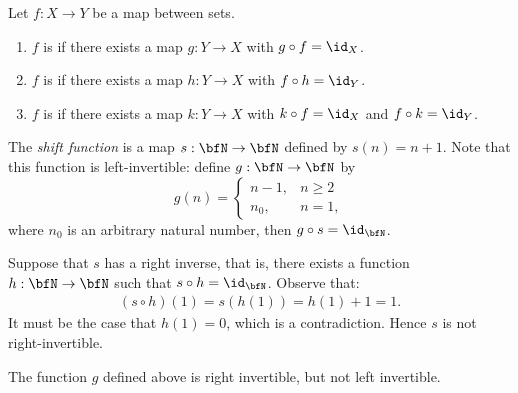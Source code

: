     \begin{definition}
        Let $f:X \rightarrow Y$ be a map between sets.
            \begin{enumerate}[label = (\arabic*)]
                \item $f$ is  if there exists a map $g:Y \rightarrow X$ with $g \circ f = \id_X$.
                \item $f$ is  if there exists a map $h:Y \rightarrow X$ with $f \circ h = \id_Y$.
                \item $f$ is  if there exists a map $k:Y \rightarrow X$ with $k\circ f = \id_X$ and $f \circ k = \id_Y$.
            \end{enumerate}
    \end{definition}
    
    \begin{example}
        The \textit{shift function} is a map $s: \bfN \rightarrow \bfN$ defined by $s(n) = n+1$. Note that this function is left-invertible: define $g: \bfN \rightarrow \bfN$  by
            \begin{equation*}
                g(n) = 
            \begin{cases}
                n-1, & n\geq 2 \\
                n_0, & n = 1,
            \end{cases}
            \end{equation*}
        where $n_0$ is an arbitrary natural number, then $g \circ s = \id_\bfN$. 

        Suppose that $s$ has a right inverse, that is, there exists a function $h:\bfN \rightarrow \bfN$ such that $s \circ h = \id_\bfN$. Observe that:
            \begin{equation*}
            \begin{split}
                (s\circ h)(1) = s(h(1)) = h(1) + 1 = 1.
            \end{split}
            \end{equation*}
        It must be the case that $h(1) = 0$, which is a contradiction. Hence $s$ is not right-invertible.
    \end{example}

    \begin{example}
        The function $g$ defined above is right invertible, but not left invertible. 
    \end{example}

